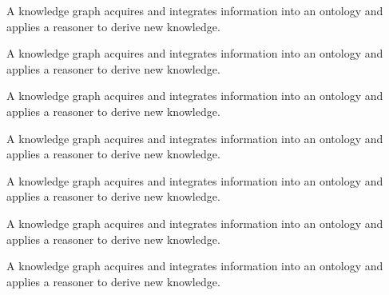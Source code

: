 \begin{definition}
\label{def:knowledge-graph7}
A knowledge graph acquires and integrates information into an ontology and applies a reasoner to derive new knowledge.
\end{definition}
\begin{definition}
\label{def:knowledge-graph8}
A knowledge graph acquires and integrates information into an ontology and applies a reasoner to derive new knowledge.
\end{definition}
\begin{definition}
\label{def:knowledge-graph9}
A knowledge graph acquires and integrates information into an ontology and applies a reasoner to derive new knowledge.
\end{definition}
\begin{definition}
\label{def:knowledge-graph10}
A knowledge graph acquires and integrates information into an ontology and applies a reasoner to derive new knowledge.
\end{definition}
\begin{definition}
\label{def:knowledge-graph11}
A knowledge graph acquires and integrates information into an ontology and applies a reasoner to derive new knowledge.
\end{definition}
\begin{definition}
\label{def:knowledge-graph12}
A knowledge graph acquires and integrates information into an ontology and applies a reasoner to derive new knowledge.
\end{definition}
\begin{definition}
\label{def:knowledge-graph13}
A knowledge graph acquires and integrates information into an ontology and applies a reasoner to derive new knowledge.
\end{definition}
